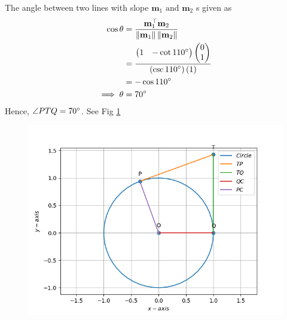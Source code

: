 \documentclass[12pt]{article}
\providecommand{\brak}[1]{\ensuremath{\left(#1\right)}}
\providecommand{\norm}[1]{\left\lVert#1\right\rVert}
\newcommand{\myvec}[1]{\ensuremath{\begin{pmatrix}#1\end{pmatrix}}}
\let\vec\mathbf
\begin{document}
The angle between two lines with slope $\vec{m}_1 \text{ and } \vec{m}_2$ s given as
\begin{align}
	\cos\theta &= \frac{\vec{m}_1^\top\vec{m}_2}{\norm{\vec{m}_1}\norm{\vec{m}_2}}\\
	&= \frac{\myvec{1&-\cot{110}\degree}\myvec{0\\1}}{\brak{\csc{110}\degree}\brak{1}}\\
	&= -\cos{110}\degree\\
	\implies \theta &= 70\degree
\end{align}
Hence, $\angle{PTQ} = 70\degree$. See Fig \ref{fig:Fig1}
\begin{figure}[!h]
	\begin{center} 
	    \includegraphics[width=\columnwidth]{figs/tangent2}
	\end{center}
\caption{}
\label{fig:Fig1}
\end{figure}
\end{document}
